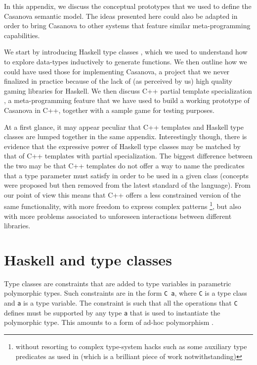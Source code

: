 In this appendix, we discuss the conceptual prototypes that we used to define the Casanova semantic model. The ideas presented here could also be adapted in order to bring Casanova to other systems that feature similar meta-programming capabilities.

We start by introducing Haskell type classes \cite{APPENDIX_E_HASKELL_TYPE_CLASSES}, which we used to understand how to explore data-types inductively to generate functions. We then outline how we could have used those for implementing Casanova, a project that we never finalized in practice because of the lack of (as perceived by us) high quality gaming libraries for Haskell. We then discuss C++ partial template specialization \cite{APPENDIX_E_PARTIAL_TEMPLATE_SPECIALIZATION}, a meta-programming feature that we have used to build a working prototype of Casanova in C++, together with a sample game for testing purposes.

At a first glance, it may appear peculiar that C++ templates and Haskell type classes are lumped together in the same appendix. Interestingly though, there is evidence \cite{APPENDIX_E_TYPE_CLASSES_VS_TEMPLATES} that the expressive power of Haskell type classes may be matched by that of C++ templates with partial specialization. The biggest difference between the two may be that C++ templates do not offer a way to name the predicates that a type parameter must satisfy in order to be used in a given class (concepts \cite{APPENDIX_E_CONCEPTS} were proposed but then removed from the latest standard of the language). From our point of view this means that C++ offers a less constrained version of the same functionality, with more freedom to express complex patterns \footnote{without resorting to complex type-system hacks such as some auxiliary type predicates as used in \cite{APPENDIX_E_HLISTS} (which is a brilliant piece of work notwithstanding)}, but also with more problems associated to unforeseen interactions between different libraries.


\section{Haskell and type classes}
Type classes are constraints that are added to type variables in parametric polymorphic types. Such constraints are in the form \texttt{C a}, where \texttt{C} is a type class and \texttt{a} is a type variable. The constraint is such that all the operations that \texttt{C} defines must be supported by any type \texttt{a} that is used to instantiate the polymorphic type. This amounts to a form of ad-hoc polymorphism \cite{APPENDIX_E_AD_HOC_POLYMORPHISM}.

